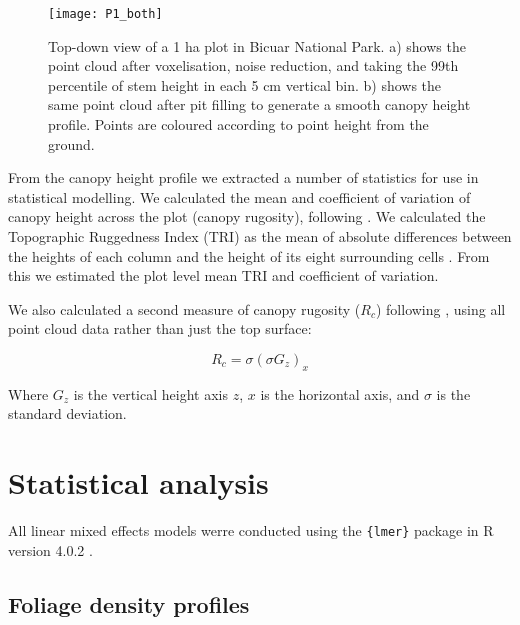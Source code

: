 \documentclass[11pt,a4paper]{article}
\begin{document}
\begin{figure}[H]
\centering
	\texttt{[image: P1\_both]}
	\caption{Top-down view of a 1 ha plot in Bicuar National Park. a) shows the point cloud after voxelisation, noise reduction, and taking the 99th percentile of stem height in each 5 cm vertical bin. b) shows the same point cloud after pit filling to generate a smooth canopy height profile. Points are coloured according to point height from the ground.}
	\label{P1_both}
\end{figure}

From the canopy height profile we extracted a number of statistics for use in statistical modelling. We calculated the mean and coefficient of variation of canopy height across the plot (canopy rugosity), following \citep{Parker2004}. We calculated the Topographic Ruggedness Index (TRI) as the mean of absolute differences between the heights of each column and the height of its eight surrounding cells \citep{Wilson2007}. From this we estimated the plot level mean TRI and coefficient of variation. 

We also calculated a second measure of canopy rugosity ($R_{c}$) following \citet{Hardiman2011}, using all point cloud data rather than just the top surface:

\begin{equation}
	R_{c} = \sigma{}(\sigma{}G_{z})_{x}
\end{equation}

Where $G_{z}$ is the vertical height axis $z$, $x$ is the horizontal axis, and $\sigma{}$ is the standard deviation.

\section{Statistical analysis}

All linear mixed effects models werre conducted using the \texttt{\{lmer\}} package in R version 4.0.2 \citep{R2021}.

\subsection{Foliage density profiles}
\end{document}
